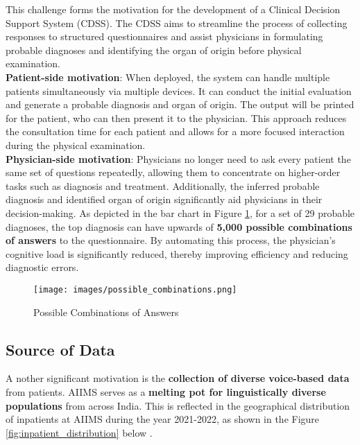 \noindent This challenge forms the motivation for the development of a Clinical Decision Support System (CDSS). The CDSS aims to streamline the process of collecting responses to structured questionnaires and assist physicians in formulating probable diagnoses and identifying the organ of origin before physical examination.\\[\baselineskip]

\noindent \textcolor{TUMRed}{\textbf{Patient-side motivation}}: When deployed, the system can handle multiple patients simultaneously via multiple devices. It can conduct the initial evaluation and generate a probable diagnosis and organ of origin. The output will be printed for the patient, who can then present it to the physician. This approach reduces the consultation time for each patient and allows for a more focused interaction during the physical examination.\\[\baselineskip]

\noindent \textcolor{TUMRed}{\textbf{Physician-side motivation}}: Physicians no longer need to ask every patient the same set of questions repeatedly, allowing them to concentrate on higher-order tasks such as diagnosis and treatment. Additionally, the inferred probable diagnosis and identified organ of origin significantly aid physicians in their decision-making. As depicted in the bar chart in Figure \ref{fig:possible_combinations}, for a set of 29 probable diagnoses, the top diagnosis can have upwards of \textcolor{TUMRed}{\textbf{5,000 possible combinations of answers}} to the questionnaire. By automating this process, the physician's cognitive load is significantly reduced, thereby improving efficiency and reducing diagnostic errors.

\begin{figure}[h]
    \centering
    \texttt{[image: images/possible\_combinations.png]}
    \caption{Possible Combinations of Answers}
    \label{fig:possible_combinations}
\end{figure}

\subsection{Source of Data}
\lettrine{A}{ }nother significant motivation is the \textcolor{TUMRed}{\textbf{collection of diverse voice-based data}} from patients. AIIMS serves as a \textcolor{TUMRed}{\textbf{melting pot for linguistically diverse populations}} from across India. This is reflected in the geographical distribution of inpatients at AIIMS during the year 2021-2022, as shown in the Figure \ref{fig:inpatient_distribution} below \cite{AIIMS2024}.\\[\baselineskip]

